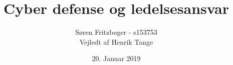 \pagestyle{fancy}
\fancyhf{}
\title{\Huge Cyber defense og ledelsesansvar}
\author{Søren Fritzbøger - s153753\\
Vejledt af Henrik Tange\\
}
\date{20. Januar 2019}



\gdef\BackMatter{
  \cleardoublepage
  \printbibliography[heading=bibintoc]
}



